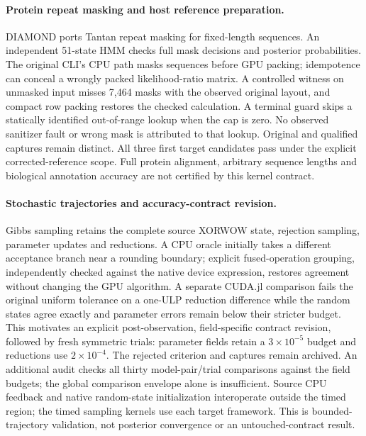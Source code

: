 \paragraph{Protein repeat masking and host reference preparation.}
DIAMOND ports Tantan repeat masking for fixed-length sequences. An independent 51-state HMM checks full mask decisions and posterior probabilities. The original CLI's CPU path masks sequences before GPU packing; idempotence can conceal a wrongly packed likelihood-ratio matrix. A controlled witness on unmasked input misses 7,464 masks with the observed original layout, and compact row packing restores the checked calculation. A terminal guard skips a statically identified out-of-range lookup when the cap is zero. No observed sanitizer fault or wrong mask is attributed to that lookup. Original and qualified captures remain distinct. All three first target candidates pass under the explicit corrected-reference scope. Full protein alignment, arbitrary sequence lengths and biological annotation accuracy are not certified by this kernel contract.

\paragraph{Stochastic trajectories and accuracy-contract revision.}
Gibbs sampling retains the complete source XORWOW state, rejection sampling, parameter updates and reductions. A CPU oracle initially takes a different acceptance branch near a rounding boundary; explicit fused-operation grouping, independently checked against the native device expression, restores agreement without changing the GPU algorithm. A separate CUDA.jl comparison fails the original uniform tolerance on a one-ULP reduction difference while the random states agree exactly and parameter errors remain below their stricter budget. This motivates an explicit post-observation, field-specific contract revision, followed by fresh symmetric trials: parameter fields retain a $3\times10^{-5}$ budget and reductions use $2\times10^{-4}$. The rejected criterion and captures remain archived. An additional audit checks all thirty model-pair/trial comparisons against the field budgets; the global comparison envelope alone is insufficient. Source CPU feedback and native random-state initialization interoperate outside the timed region; the timed sampling kernels use each target framework. This is bounded-trajectory validation, not posterior convergence or an untouched-contract result.

